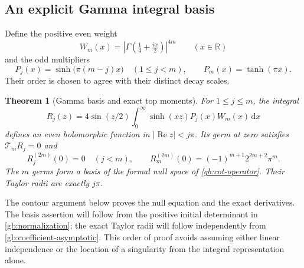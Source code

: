 \documentclass[11pt,a4paper]{article}
\numberwithin{equation}{section}
\newtheorem{theorem}{Theorem}[section]
\theoremstyle{definition}
\theoremstyle{remark}
\newcommand{\dd}{\,\mathrm d}
\newcommand{\Rea}{\operatorname{Re}}
\begin{document}
\subsection{An explicit Gamma integral basis}

Define the positive even weight
\begin{equation}\label{gb:W}
 W_m(x)=\left|\Gamma\!\left(\tfrac14+\tfrac{ix}{2}\right)\right|^{4m}
 \qquad(x\in\mathbb R)
\end{equation}
and the odd multipliers
\begin{equation}\label{gb:P}
 P_j(x)=\sinh\!\bigl(\pi(m-j)x\bigr)\quad(1\le j<m),
 \qquad P_m(x)=\tanh(\pi x).
\end{equation}
Their order is chosen to agree with their distinct decay scales.

\begin{theorem}[Gamma basis and exact top moments]\label{gb:basis}
For $1\le j\le m$, the integral
\begin{equation}\label{gb:R}
 R_j(z)=4\sin(z/2)\int_0^\infty
                  \sinh(xz)P_j(x)W_m(x)\dd x
\end{equation}
defines an even holomorphic function in $|\Rea z|<j\pi$.
Its germ at zero satisfies $\mathcal T_mR_j=0$ and
\begin{equation}\label{gb:top-derivative}
 R_j^{(2m)}(0)=0\quad(j<m),\qquad
 R_m^{(2m)}(0)=(-1)^{m+1}2^{2m+2}\pi^m.
\end{equation}
The $m$ germs form a basis of the formal null space of
\eqref{gb:cot-operator}.  Their Taylor radii are exactly $j\pi$.
\end{theorem}

The contour argument below proves the null equation and the exact
derivatives.  The basis assertion will follow from the positive
initial determinant in \cref{gb:normalization}; the exact Taylor
radii will follow independently from \cref{gb:coefficient-asymptotic}.
This order of proof avoids assuming either linear independence or
the location of a singularity from the integral representation alone.
\end{document}
